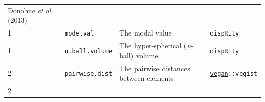 \documentclass[]{book}
\theoremstyle{definition}
\theoremstyle{definition}
\theoremstyle{remark}
\begin{document}
\begin{longtable}[]{@{}llll@{}}
\begin{minipage}[t]{0.11\columnwidth}
Donohue \emph{et al.} (2013)\strut
\end{minipage}\tabularnewline
\begin{minipage}[t]{0.08\columnwidth}\raggedright\strut
1\strut
\end{minipage} & \begin{minipage}[t]{0.08\columnwidth}\raggedright\strut
\texttt{mode.val}\strut
\end{minipage} & \begin{minipage}[t]{0.61\columnwidth}\raggedright\strut
The modal value\strut
\end{minipage} & \begin{minipage}[t]{0.11\columnwidth}\raggedright\strut
\texttt{dispRity}\strut
\end{minipage}\tabularnewline
\begin{minipage}[t]{0.08\columnwidth}\raggedright\strut
1\strut
\end{minipage} & \begin{minipage}[t]{0.08\columnwidth}\raggedright\strut
\texttt{n.ball.volume}\strut
\end{minipage} & \begin{minipage}[t]{0.61\columnwidth}\raggedright\strut
The hyper-spherical (\emph{n}-ball) volume\strut
\end{minipage} & \begin{minipage}[t]{0.11\columnwidth}\raggedright\strut
\texttt{dispRity}\strut
\end{minipage}\tabularnewline
\begin{minipage}[t]{0.08\columnwidth}\raggedright\strut
2\strut
\end{minipage} & \begin{minipage}[t]{0.08\columnwidth}\raggedright\strut
\texttt{pairwise.dist}\strut
\end{minipage} & \begin{minipage}[t]{0.61\columnwidth}\raggedright\strut
The pairwise distances between elements\strut
\end{minipage} & \begin{minipage}[t]{0.11\columnwidth}\raggedright\strut
\href{https://cran.r-project.org/web/packages/vegan/index.html}{\texttt{vegan}}\texttt{::vegist}\strut
\end{minipage}\tabularnewline
\begin{minipage}[t]{0.08\columnwidth}\raggedright\strut
2\strut
\end{minipage} & \begin{minipage}[t]{0.08\columnwidth}\raggedright\strut

\end{minipage}
\end{longtable}
\end{document}
